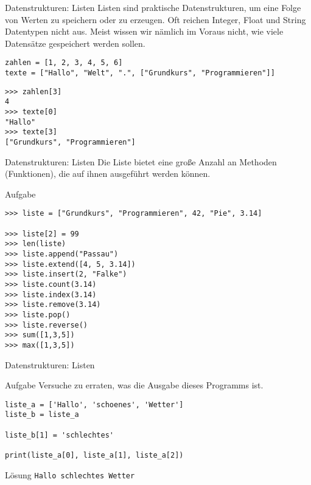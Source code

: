 \begin{frame}[fragile]{Datenstrukturen: Listen}
Listen sind praktische Datenstrukturen, um eine Folge von Werten zu 
speichern oder zu erzeugen.
Oft reichen Integer, Float und String Datentypen nicht aus. Meist wissen wir nämlich im Voraus nicht, 
wie viele Datensätze gespeichert werden sollen.
\pause{}
\begin{lstlisting}
zahlen = [1, 2, 3, 4, 5, 6]
texte = ["Hallo", "Welt", ".", ["Grundkurs", "Programmieren"]]
\end{lstlisting}

\begin{lstlisting}
>>> zahlen[3]
4
>>> texte[0]
"Hallo"
>>> texte[3]
["Grundkurs", "Programmieren"]
\end{lstlisting}
\end{frame}

\begin{frame}[fragile]{Datenstrukturen: Listen}
Die Liste bietet eine große Anzahl an Methoden (Funktionen), die auf ihnen
ausgeführt werden können.
\begin{block}{Aufgabe}
\begin{lstlisting}
>>> liste = ["Grundkurs", "Programmieren", 42, "Pie", 3.14]

>>> liste[2] = 99
>>> len(liste)
>>> liste.append("Passau")
>>> liste.extend([4, 5, 3.14])
>>> liste.insert(2, "Falke")
>>> liste.count(3.14)
>>> liste.index(3.14)
>>> liste.remove(3.14)
>>> liste.pop()
>>> liste.reverse()
>>> sum([1,3,5])
>>> max([1,3,5])
\end{lstlisting}
\end{block}
\end{frame}

\begin{frame}[fragile]{Datenstrukturen: Listen}
\begin{block}{Aufgabe}
Versuche zu erraten, was die Ausgabe dieses Programms ist.
\end{block}

\begin{lstlisting}
liste_a = ['Hallo', 'schoenes', 'Wetter']
liste_b = liste_a

liste_b[1] = 'schlechtes'

print(liste_a[0], liste_a[1], liste_a[2])  
\end{lstlisting}
\pause{}
\begin{exampleblock}{Lösung}
    \texttt{Hallo schlechtes Wetter}
\end{exampleblock}
\end{frame}

